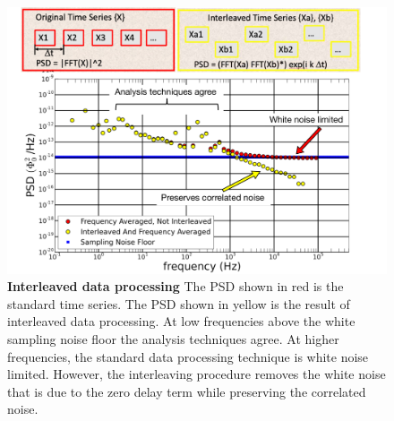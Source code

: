 \begin{figure}[h]
    \begin{center}
    \includegraphics[width=175mm]{./PDF/interleaved_spectrum_191001_648p.pdf}
    \end{center}
    \caption{\textbf{Interleaved data processing}
    The PSD shown in red is the standard time series.
    The PSD shown in yellow is the result of interleaved data processing.
    At low frequencies above the white sampling noise floor the analysis techniques agree.
    At higher frequencies, the standard data processing technique is white noise limited.
    However, the interleaving procedure removes the white noise that is due to the zero delay term while preserving the correlated noise.
    }
    \label{Averaging_window_size}
\end{figure}

